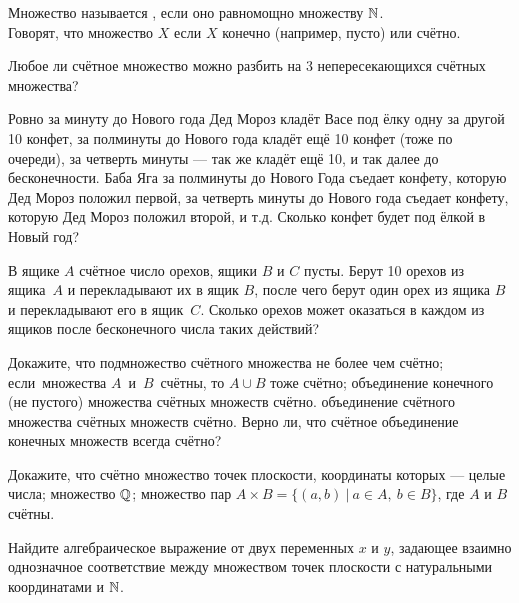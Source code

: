 \documentclass[a4paper,12pt]{article}
\begin{document}
 Множество называется , если
оно равномощно множеству $\mathbb{N}$.\\
Говорят, что множество $X$  если $X$ конечно (например, пусто)
или счётно.


Любое ли счётное множество можно разбить на 3
непересекающихся счётных множества?

Ровно за минуту до Нового года Дед Мороз кладёт Васе под ёлку одну за другой 10 конфет, за полминуты до Нового года кладёт ещё 10 конфет (тоже по очереди), за четверть минуты --- так же кладёт ещё 10, и так далее до бесконечности. Баба Яга за полминуты до Нового Года съедает конфету, которую Дед Мороз положил первой, за четверть минуты до Нового года съедает конфету, которую Дед Мороз положил второй, и т.д. Сколько конфет будет под ёлкой в Новый год?

В ящике $A$  счётное число орехов,
ящики $B$ и $C$  пусты. Берут 10 орехов из ящика~$A$
и перекладывают их в ящик $B$, после чего берут
один орех из ящика $B$ и перекладывают его в ящик~$C$.
Сколько орехов может оказаться в каждом из ящиков после
бесконечного числа таких действий?


Докажите, что
подмножество счётного множества не более чем счётно;\\
если~множества $A$~и~$B$~счёт\-ны, %
то $A \cup B$ тоже
счётно;
объединение конечного (не пустого) множества счётных множеств счётно.
объединение счётного множества счётных множеств счётно.
 Верно ли, что счётное объединение конечных множеств всегда
счётно?

 Докажите, что счётно
 множество точек плоскости, координаты
которых --- целые числа;
 множество $\mathbb{Q}$;
 множество пар $A\times B=\{(a,b)\ |\ a\in A,\ b\in B\}$,
где $A$ и $B$ счётны.

Найдите алгебраическое выражение от двух переменных $x$ и $y$,
задающее взаимно однозначное соответствие между
множеством точек плоскости с натуральными координатами и $\mathbb{N}$.
\end{document}
